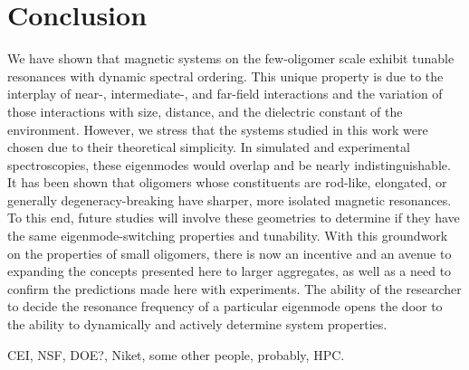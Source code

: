 \documentclass[journal=apchd5,manuscript=article]{achemso}
\begin{document}
\section{Conclusion}
We have shown that magnetic systems on the few-oligomer scale exhibit tunable resonances with dynamic spectral ordering. This unique property is due to the interplay of near-, intermediate-, and far-field interactions and the variation of those interactions with size, distance, and the dielectric constant of the environment. However, we stress that the systems studied in this work were chosen due to their theoretical simplicity. In simulated and experimental spectroscopies, these eigenmodes would overlap and be nearly indistinguishable. It has been shown that oligomers whose constituents are rod-like, elongated, or generally degeneracy-breaking have sharper, more isolated magnetic resonances\cite{Cherqui2016}. To this end, future studies will involve these geometries to determine if they have the same eigenmode-switching properties and tunability. With this groundwork on the properties of small oligomers, there is now an incentive and an avenue to expanding the concepts presented here to larger aggregates, as well as a need to confirm the predictions made here with experiments. The ability of the researcher to decide the resonance frequency of a particular eigenmode opens the door to the ability to dynamically and actively determine system properties.

\begin{acknowledgement}
CEI, NSF, DOE?, Niket, some other people, probably, HPC.
\end{acknowledgement}


\end{document}
